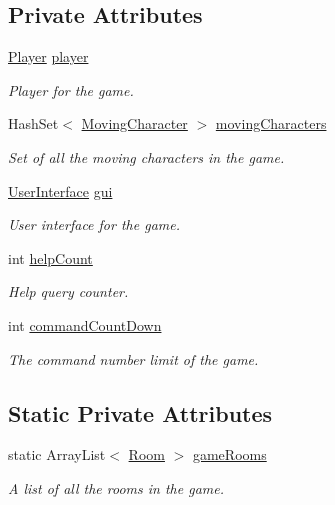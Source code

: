 \subsection*{Private Attributes}
\begin{DoxyCompactItemize}
\item 
\hyperlink{classpkg__world_1_1Player}{Player} \hyperlink{classpkg__game_1_1GameEngine_a864d14b3375ad026e700ba0c0b9f9d2d}{player}
\begin{DoxyCompactList}\small\item\em Player for the game. \end{DoxyCompactList}\item 
Hash\-Set$<$ \hyperlink{classpkg__world_1_1pkg__characters_1_1MovingCharacter}{Moving\-Character} $>$ \hyperlink{classpkg__game_1_1GameEngine_a64a7051b0ae6fb816d566be8ddbab3cb}{moving\-Characters}
\begin{DoxyCompactList}\small\item\em Set of all the moving characters in the game. \end{DoxyCompactList}\item 
\hyperlink{classpkg__game_1_1UserInterface}{User\-Interface} \hyperlink{classpkg__game_1_1GameEngine_a152cd31474cc8a5980e32c2cab6e7d36}{gui}
\begin{DoxyCompactList}\small\item\em User interface for the game. \end{DoxyCompactList}\item 
int \hyperlink{classpkg__game_1_1GameEngine_a3229e823376625b5d9102d24d628a0fb}{help\-Count}
\begin{DoxyCompactList}\small\item\em Help query counter. \end{DoxyCompactList}\item 
int \hyperlink{classpkg__game_1_1GameEngine_af4ea44f51563b4e2c0a67fe918bf5e3c}{command\-Count\-Down}
\begin{DoxyCompactList}\small\item\em The command number limit of the game. \end{DoxyCompactList}\end{DoxyCompactItemize}
\subsection*{Static Private Attributes}
\begin{DoxyCompactItemize}
\item 
static Array\-List$<$ \hyperlink{classpkg__world_1_1Room}{Room} $>$ \hyperlink{classpkg__game_1_1GameEngine_a4b4afca13ceeb1057e50471670bf3306}{game\-Rooms}
\begin{DoxyCompactList}\small\item\em A list of all the rooms in the game. \end{DoxyCompactList}\end{DoxyCompactItemize}



